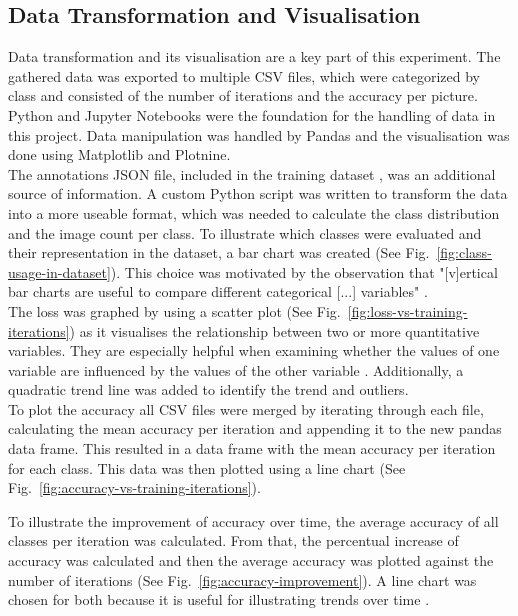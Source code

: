 \subsection{Data Transformation and Visualisation}
Data transformation and its visualisation are a key part of this experiment. The gathered data was exported to multiple CSV files, 
which were categorized by class and consisted of the number of iterations and the accuracy per picture. Python and Jupyter Notebooks were the
foundation for the handling of data in this project. Data manipulation was handled by Pandas and the visualisation was done using Matplotlib
and Plotnine.\\

The annotations JSON file, included in the training dataset \parencite{pascal2023}, was an additional source of information. 
A custom Python script was written to transform the data into a more useable format, which was needed to calculate the class distribution 
and the image count per class. To illustrate which classes were evaluated and their representation in the dataset, a bar chart was created 
(See Fig.~\ref{fig:class-usage-in-dataset}). This choice was motivated by the observation that "[v]ertical bar charts are useful to compare 
different categorical [...] variables" \parencite{Statistics-Canada2021}.\\

The loss was graphed by using a scatter plot (See Fig.~\ref{fig:loss-vs-training-iterations})
as it visualises the relationship between two or more quantitative variables. They are especially helpful when examining whether
the values of one variable are influenced by the values of the other variable \parencite{Statistics-Canada2021b}. 
Additionally, a quadratic trend line was added to identify the trend and outliers.\\

To plot the accuracy all CSV files were merged by iterating through each file, calculating the mean accuracy per iteration and appending it
to the new pandas data frame. This resulted in a data frame with the mean accuracy per iteration for each class. This data was then plotted using
a line chart (See Fig.~\ref{fig:accuracy-vs-training-iterations}).

To illustrate the improvement of accuracy over time, the average accuracy of all classes per iteration was calculated.
From that, the percentual increase of accuracy was calculated and then the average accuracy was plotted against the number of iterations
(See Fig.~\ref{fig:accuracy-improvement}).
A line chart was chosen for both because it is useful for illustrating trends over time \parencite{Statistics-Canada2021a}.\\

